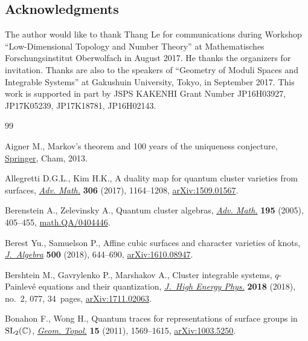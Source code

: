 \documentclass[pdftex]{sigma}
\numberwithin{equation}{section}
\begin{document}
\subsection*{Acknowledgments}
The author would like to thank Thang Le for communications during Workshop ``Low-Dimen\-sional Topology and Number Theory'' at Mathematisches Forschungsinstitut Oberwolfach in August 2017. He thanks the organizers for invitation. Thanks are also to the speakers of ``Geo\-metry of Moduli Spaces and Integrable Systems'' at Gakushuin University, Tokyo, in September 2017. This work is supported in part by JSPS KAKENHI Grant Number JP16H03927,
JP17K05239, JP17K18781, JP16H02143.

\begin{thebibliography}{99}
\footnotesize\itemsep=0pt

Aigner M., Markov's theorem and 100 years of the uniqueness conjecture,
 \href{https://doi.org/10.1007/978-3-319-00888-2}{Springer}, Cham, 2013.

Allegretti D.G.L., Kim H.K., A duality map for quantum cluster varieties from
 surfaces, \href{https://doi.org/10.1016/j.aim.2016.11.007}{\textit{Adv. Math.}} \textbf{306} (2017), 1164--1208,
 \href{https://arxiv.org/abs/1509.01567}{arXiv:1509.01567}.

Berenstein A., Zelevinsky A., Quantum cluster algebras, \href{https://doi.org/10.1016/j.aim.2004.08.003}{\textit{Adv. Math.}}
 \textbf{195} (2005), 405--455, \href{https://arxiv.org/abs/math.QA/0404446}{math.QA/0404446}.

Berest Yu., Samuelson P., Affine cubic surfaces and character varieties of
 knots, \href{https://doi.org/10.1016/j.jalgebra.2017.11.015}{\textit{J.~Algebra}} \textbf{500} (2018), 644--690,
 \href{https://arxiv.org/abs/1610.08947}{arXiv:1610.08947}.

Bershtein M., Gavrylenko P., Marshakov A., Cluster integrable systems,
 {$q$}-{P}ainlev\'{e} equations and their quantization, \href{https://doi.org/10.1007/jhep02(2018)077}{\textit{J.~High Energy
 Phys.}} \textbf{2018} (2018), no.~2, 077, 34~pages, \href{https://arxiv.org/abs/1711.02063}{arXiv:1711.02063}.

Bonahon F., Wong H., Quantum traces for representations of surface groups in
 {${\rm SL}_2(\mathbb C)$}, \href{https://doi.org/10.2140/gt.2011.15.1569}{\textit{Geom. Topol.}} \textbf{15} (2011),
 1569--1615, \href{https://arxiv.org/abs/1003.5250}{arXiv:1003.5250}.


\end{thebibliography}
\end{document}
